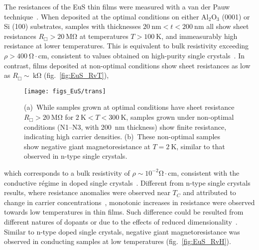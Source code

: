 The resistances of the EuS thin films were measured with a van der Pauw technique~\cite{VdP1958}. When deposited at the optimal conditions on either Al$_2$O$_3$ (0001) or Si (100) substrates, samples with thicknesses $20~\mathrm{nm}<t<200~\mathrm{nm}$ all show sheet resistances $R_\Box>20~\mathrm{M\Omega}$ at temperatures $T > 100~\mathrm{K}$, and immeasurably  high resistance at lower temperatures. This is equivalent to bulk resistivity exceeding  $\rho>400~\mathrm{\Omega\cdot{}cm}$, consistent to values obtained on high-purity single crystals~\cite{EuS_Shafer}. In contrast, films deposited at non-optimal conditions show sheet resistances as low as $R_\Box\sim~\mathrm{k\Omega}$ (fig.~\ref{fig:EuS_RvT}), %
%
\begin{figure}[ht]%
    \subfloat{\label{fig:EuS_RvT}}%
    \subfloat{\label{fig:EuS_RvH}}%
    \centering%
    \texttt{[image: figs\_EuS/trans]}%
    \caption[Electrical properties of EuS thin films]{\label{fig:EuS_transport}(a)~While samples grown at optimal conditions have sheet resistance $R_\Box>20~\mathrm{M\Omega}$ for $2~\mathrm{K}<T<300~\mathrm{K}$, samples grown under non-optimal conditions (N1--N3, with 200~nm thickness) show finite resistance, indicating high carrier densities. (b)~These non-optimal samples show negative giant magnetoresistance at $T=2~\mathrm{K}$, similar to that observed in n-type single crystals.}%
\end{figure}%
%
which corresponds to a bulk resistivity of $\rho\sim10^{-2}\mathrm{\Omega\cdot{}cm}$, consistent with the conductive r\'egime in doped single crystals~\cite{EuS_ntype}. Different from n-type single crystals results, where resistance anomalies were observed near $T_C$ and attributed to change in carrier concentrations~\cite{EuS_ntype, EuX_doped_transport}, monotonic increases in resistance were observed towards low temperatures in thin films. Such difference could be resulted from different natures of dopants or due to the effects of reduced dimensionality~\cite{2D_conduction}. Similar to n-type doped single crystals, negative giant magnetoresistance was observed in conducting samples at low temperatures (fig.~\ref{fig:EuS_RvH}).

